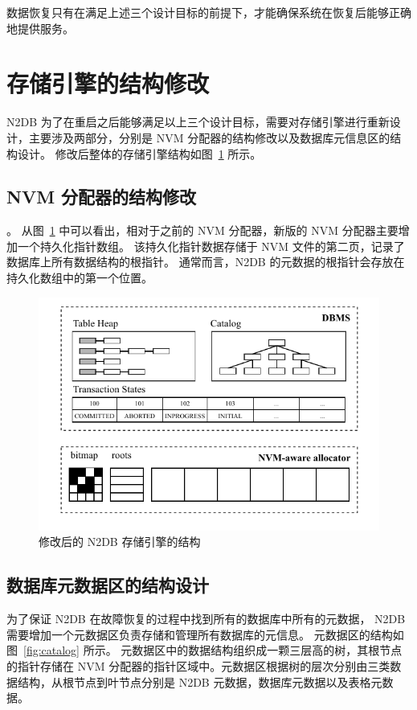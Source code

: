 数据恢复只有在满足上述三个设计目标的前提下，才能确保系统在恢复后能够正确地提供服务。

\section{存储引擎的结构修改}

N2DB 为了在重启之后能够满足以上三个设计目标，需要对存储引擎进行重新设计，主要涉及两部分，分别是 NVM 分配器的结构修改以及数据库元信息区的结构设计。
修改后整体的存储引擎结构如图~\ref{fig:nvm-allocator} 所示。

\subsection{NVM 分配器的结构修改}。
从图~\ref{fig:nvm-allocator} 中可以看出，相对于之前的 NVM 分配器，新版的 NVM 分配器主要增加一个持久化指针数组。
该持久化指针数据存储于 NVM 文件的第二页，记录了数据库上所有数据结构的根指针。
通常而言，N2DB 的元数据的根指针会存放在持久化数组中的第一个位置。

\begin{figure}[ht]
    \centering
    \includegraphics[width=1\linewidth]{figures/nvm-allocator}
    \caption{修改后的 N2DB 存储引擎的结构}
    \label{fig:nvm-allocator}
\end{figure}

\subsection{数据库元数据区的结构设计}

为了保证 N2DB 在故障恢复的过程中找到所有的数据库中所有的元数据， N2DB 需要增加一个元数据区负责存储和管理所有数据库的元信息。
元数据区的结构如图~\ref{fig:catalog} 所示。
元数据区中的数据结构组织成一颗三层高的树，其根节点的指针存储在 NVM 分配器的指针区域中。元数据区根据树的层次分别由三类数据结构，从根节点到叶节点分别是 N2DB 元数据，数据库元数据以及表格元数据。

